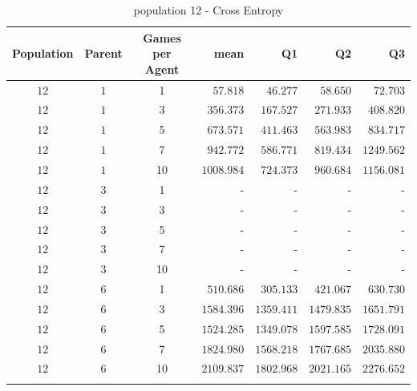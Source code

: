 \begin{table}[H]
\centering
\small
\begin{tabular}{c c c r r r r}
Population & Parent & Games per Agent & mean & Q1 & Q2 & Q3\\
\hline
$12$ & $1$ & 1 & $57.818$ & $46.277$ & $58.650$ & $72.703$\\
$12$ & $1$ & 3 & $356.373$ & $167.527$ & $271.933$ & $408.820$\\
$12$ & $1$ & 5 & $673.571$ & $411.463$ & $563.983$ & $834.717$\\
$12$ & $1$ & 7 & $942.772$ & $586.771$ & $819.434$ & $1249.562$\\
\hdashline
$12$ & $1$ & 10 & $1008.984$ & $724.373$ & $960.684$ & $1156.081$\\
\hdashline
$12$ & $3$ & 1 & - & - & - & -\\
$12$ & $3$ & 3 & - & - & - & -\\
$12$ & $3$ & 5 & - & - & - & -\\
\hdashline
$12$ & $3$ & 7 & - & - & - & -\\
\hdashline
$12$ & $3$ & 10 & - & - & - & -\\
$12$ & $6$ & 1 & $510.686$ & $305.133$ & $421.067$ & $630.730$\\
$12$ & $6$ & 3 & $1584.396$ & $1359.411$ & $1479.835$ & $1651.791$\\
$12$ & $6$ & 5 & $1524.285$ & $1349.078$ & $1597.585$ & $1728.091$\\
$12$ & $6$ & 7 & $1824.980$ & $1568.218$ & $1767.685$ & $2035.880$\\
\hdashline
$12$ & $6$ & 10 & $2109.837$ & $1802.968$ & $2021.165$ & $2276.652$\\
\hdashline
\end{tabular}
\caption{population 12 - Cross Entropy}
\end{table}

